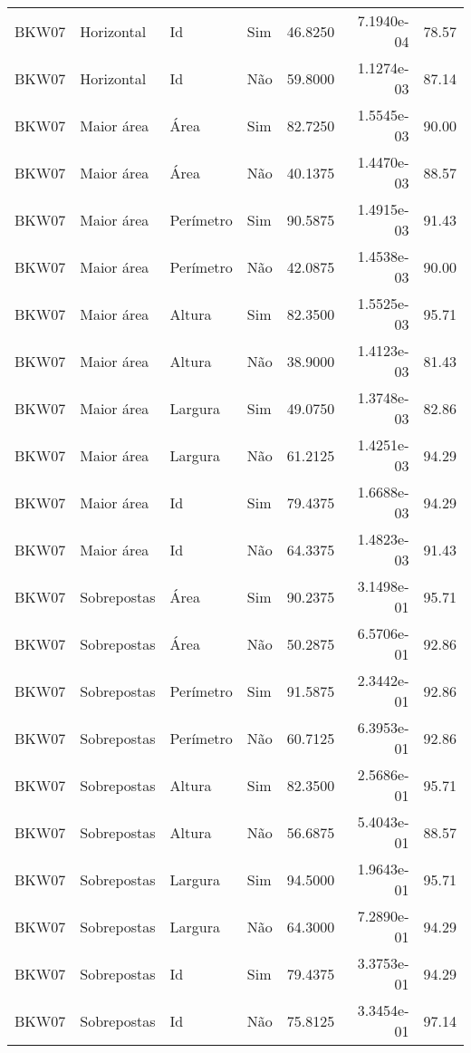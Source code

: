 \begin{tabular}{llllrrr}
    BKW07     & Horizontal  & Id        & Sim         & 46.8250      & 7.1940e-04 & 78.57    \\
    BKW07     & Horizontal  & Id        & Não         & 59.8000      & 1.1274e-03 & 87.14    \\
    BKW07     & Maior área  & Área      & Sim         & 82.7250      & 1.5545e-03 & 90.00    \\
    BKW07     & Maior área  & Área      & Não         & 40.1375      & 1.4470e-03 & 88.57    \\
    BKW07     & Maior área  & Perímetro & Sim         & 90.5875      & 1.4915e-03 & 91.43    \\
    BKW07     & Maior área  & Perímetro & Não         & 42.0875      & 1.4538e-03 & 90.00    \\
    BKW07     & Maior área  & Altura    & Sim         & 82.3500      & 1.5525e-03 & 95.71    \\
    BKW07     & Maior área  & Altura    & Não         & 38.9000      & 1.4123e-03 & 81.43    \\
    BKW07     & Maior área  & Largura   & Sim         & 49.0750      & 1.3748e-03 & 82.86    \\
    BKW07     & Maior área  & Largura   & Não         & 61.2125      & 1.4251e-03 & 94.29    \\
    BKW07     & Maior área  & Id        & Sim         & 79.4375      & 1.6688e-03 & 94.29    \\
    BKW07     & Maior área  & Id        & Não         & 64.3375      & 1.4823e-03 & 91.43    \\
    BKW07     & Sobrepostas & Área      & Sim         & 90.2375      & 3.1498e-01 & 95.71    \\
    BKW07     & Sobrepostas & Área      & Não         & 50.2875      & 6.5706e-01 & 92.86    \\
    BKW07     & Sobrepostas & Perímetro & Sim         & 91.5875      & 2.3442e-01 & 92.86    \\
    BKW07     & Sobrepostas & Perímetro & Não         & 60.7125      & 6.3953e-01 & 92.86    \\
    BKW07     & Sobrepostas & Altura    & Sim         & 82.3500      & 2.5686e-01 & 95.71    \\
    BKW07     & Sobrepostas & Altura    & Não         & 56.6875      & 5.4043e-01 & 88.57    \\
    BKW07     & Sobrepostas & Largura   & Sim         & 94.5000      & 1.9643e-01 & 95.71    \\
    BKW07     & Sobrepostas & Largura   & Não         & 64.3000      & 7.2890e-01 & 94.29    \\
    BKW07     & Sobrepostas & Id        & Sim         & 79.4375      & 3.3753e-01 & 94.29    \\
    BKW07     & Sobrepostas & Id        & Não         & 75.8125      & 3.3454e-01 & 97.14    \\
    \hline
\end{tabular}